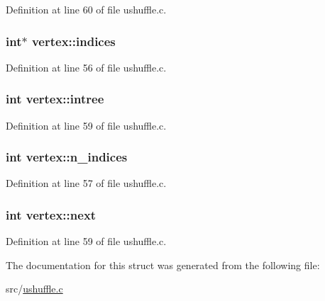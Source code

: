Definition at line 60 of file ushuffle.\+c.

\hypertarget{structvertex_a583999f36a31b761343555543e2eefce}{
\subsubsection[{indices}]{\setlength{\rightskip}{0pt plus 5cm}int$\ast$ vertex\+::indices}}\label{structvertex_a583999f36a31b761343555543e2eefce}


Definition at line 56 of file ushuffle.\+c.

\hypertarget{structvertex_ade015e1a35c3260e139ff7b4e5d4933d}{
\subsubsection[{intree}]{\setlength{\rightskip}{0pt plus 5cm}int vertex\+::intree}}\label{structvertex_ade015e1a35c3260e139ff7b4e5d4933d}


Definition at line 59 of file ushuffle.\+c.

\hypertarget{structvertex_a296df49f6cab00157977d610f7dbae5b}{
\subsubsection[{n\+\_\+indices}]{\setlength{\rightskip}{0pt plus 5cm}int vertex\+::n\+\_\+indices}}\label{structvertex_a296df49f6cab00157977d610f7dbae5b}


Definition at line 57 of file ushuffle.\+c.

\hypertarget{structvertex_ac67d53f1ccda0ec85b4870127b6928ad}{
\subsubsection[{next}]{\setlength{\rightskip}{0pt plus 5cm}int vertex\+::next}}\label{structvertex_ac67d53f1ccda0ec85b4870127b6928ad}


Definition at line 59 of file ushuffle.\+c.



The documentation for this struct was generated from the following file\+:\begin{DoxyCompactItemize}
\item 
src/\hyperlink{ushuffle_8c}{ushuffle.\+c}\end{DoxyCompactItemize}
